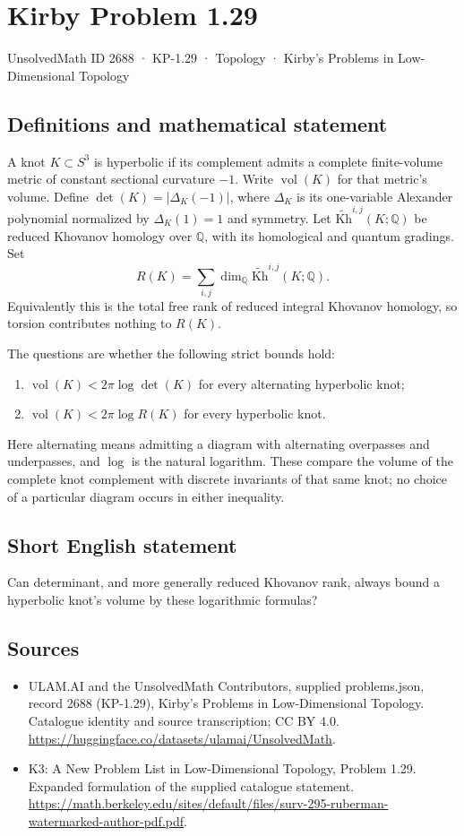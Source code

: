 \documentclass[11pt,a4paper]{article}
\begin{document}
\section*{Kirby Problem 1.29}\label{2688}
{\small UnsolvedMath ID 2688 · KP-1.29 · Topology · Kirby's Problems in Low-Dimensional Topology}
\subsection{Definitions and mathematical statement}
A knot $K\subset S^3$ is hyperbolic if its complement admits a complete
finite-volume metric of constant sectional curvature $-1$. Write
$\operatorname{vol}(K)$ for that metric's volume. Define
$\det(K)=|\Delta_K(-1)|$, where $\Delta_K$ is its one-variable Alexander
polynomial normalized by $\Delta_K(1)=1$ and symmetry.
Let $\widetilde{\mathrm{Kh}}^{i,j}(K;\mathbb Q)$ be reduced Khovanov homology
over $\mathbb Q$, with its homological and quantum gradings. Set
\[
R(K)=\sum_{i,j}\dim_{\mathbb Q}\widetilde{\mathrm{Kh}}^{i,j}(K;\mathbb Q).
\]
Equivalently this is the total free rank of reduced integral Khovanov homology,
so torsion contributes nothing to $R(K)$.

The questions are whether the following strict bounds hold:
\begin{enumerate}
\item $\operatorname{vol}(K)<2\pi\log\det(K)$ for every alternating hyperbolic knot;
\item $\operatorname{vol}(K)<2\pi\log R(K)$ for every hyperbolic knot.
\end{enumerate}
Here alternating means admitting a diagram with alternating overpasses and
underpasses, and $\log$ is the natural logarithm. These compare the volume of
the complete knot complement with discrete invariants of that same knot;
no choice of a particular diagram occurs in either inequality.
\subsection{Short English statement}
Can determinant, and more generally reduced Khovanov rank, always bound a hyperbolic knot's volume by these logarithmic formulas?
\subsection{Sources}
\begin{itemize}
\item[S1] ULAM.AI and the UnsolvedMath Contributors, supplied problems.json, record 2688 (KP-1.29), Kirby's Problems in Low-Dimensional Topology. Catalogue identity and source transcription; CC BY 4.0.
\url{https://huggingface.co/datasets/ulamai/UnsolvedMath}.
\item[S2] K3: A New Problem List in Low-Dimensional Topology, Problem 1.29. Expanded formulation of the supplied catalogue statement.
\url{https://math.berkeley.edu/sites/default/files/surv-295-ruberman-watermarked-author-pdf.pdf}.
\end{itemize}
\end{document}

